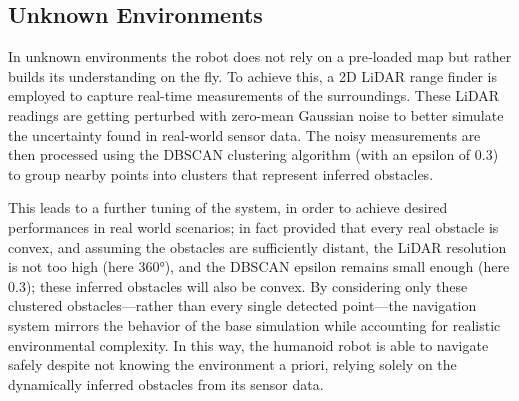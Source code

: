 \subsection{Unknown Environments}
In unknown environments the robot does not rely on a pre‐loaded map but rather builds its understanding on the fly.
To achieve this, a 2D LiDAR range finder is employed to capture real-time measurements of the surroundings.
These LiDAR readings are getting perturbed with zero-mean Gaussian noise to better simulate the uncertainty found in real-world sensor data.
The noisy measurements are then processed using the DBSCAN clustering algorithm (with an epsilon of 0.3) to group nearby points into clusters that represent inferred obstacles.

This leads to a further tuning of the system, in order to achieve desired performances in real world scenarios; in
fact provided that every real obstacle is convex, and assuming the
obstacles are sufficiently distant, the LiDAR resolution is not too high (here 360°), and the DBSCAN epsilon
remains small enough (here 0.3); these inferred obstacles will also be convex.
By considering only these clustered obstacles—rather than every single detected point—the navigation system mirrors the behavior of the base simulation while accounting for realistic environmental complexity.
In this way, the humanoid robot is able to navigate safely despite not knowing the environment a priori, relying solely on the dynamically inferred obstacles from its sensor data.






